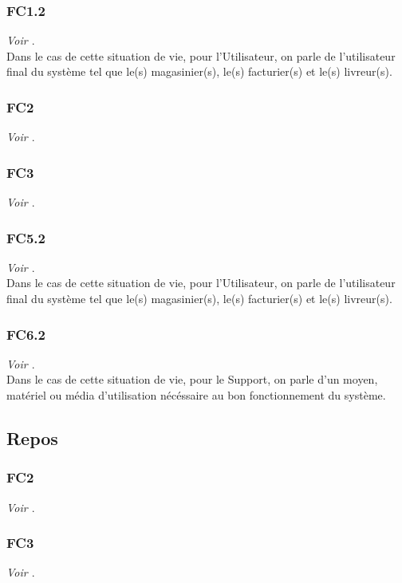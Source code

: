 \documentclass{article}
\begin{document}
\subsubsection{FC1.2}
\textit{Voir \hyperref[cat:fc1]{}}.
\medskip\\
Dans le cas de cette situation de vie, pour l'Utilisateur, on parle de
l'utilisateur final du système tel que le(s) magasinier(s), le(s) facturier(s)
et le(s) livreur(s).

\subsubsection{FC2}
\textit{Voir \hyperref[cat:fc2]{}}.

\subsubsection{FC3}
\textit{Voir \hyperref[cat:fc3]{}}.

\subsubsection{FC5.2}
\textit{Voir \hyperref[cat:fc5]{}}.
\medskip\\
Dans le cas de cette situation de vie, pour l'Utilisateur, on parle de
l'utilisateur final du système tel que le(s) magasinier(s), le(s) facturier(s)
et le(s) livreur(s).

\subsubsection{FC6.2}
\textit{Voir \hyperref[cat:fc6]{}}.
\medskip\\
Dans le cas de cette situation de vie, pour le Support, on parle d'un moyen,
matériel ou média d'utilisation nécéssaire au bon fonctionnement du système.

\subsection{Repos}

\subsubsection{FC2}
\textit{Voir \hyperref[cat:fc2]{}}.

\subsubsection{FC3}
\textit{Voir \hyperref[cat:fc3]{}}.
\end{document}
